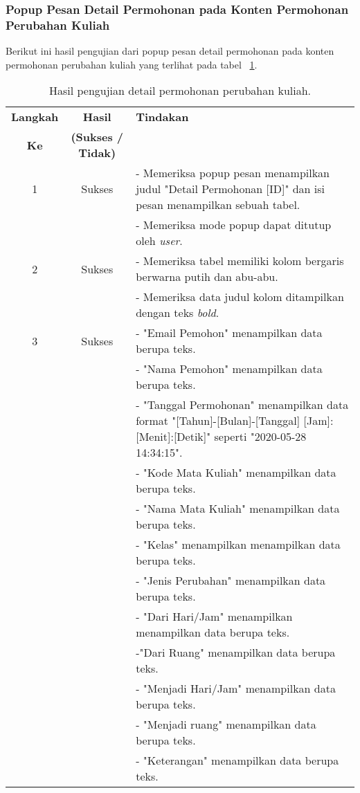 \subsubsection{Popup Pesan Detail Permohonan pada Konten Permohonan Perubahan Kuliah}
Berikut ini hasil pengujian dari popup pesan detail permohonan pada konten permohonan perubahan kuliah yang terlihat pada tabel ~\ref{hasil:DetailPermohonanPerubahanKuliah}.
\begin{table}[H]
	\centering 
	\caption{Hasil pengujian detail permohonan perubahan kuliah.}
	\label{hasil:DetailPermohonanPerubahanKuliah}
	\begin{tabular}{|c| c| p{}|}
		\toprule
		\textbf{Langkah} & \textbf{Hasil} & \textbf{Tindakan}\\
		\textbf{Ke} & \textbf{(Sukses / Tidak)} &\\
		\midrule
		1&Sukses& - Memeriksa popup pesan menampilkan judul "Detail Permohonan [ID]" dan isi pesan menampilkan sebuah tabel.\\
		&& - Memeriksa mode popup dapat ditutup oleh \textit{user}.\\
		\hline
		2&Sukses&- Memeriksa tabel memiliki kolom bergaris berwarna putih dan abu-abu.\\
		&& - Memeriksa data judul kolom ditampilkan dengan teks \textit{bold}.	\\	
		\hline
		3&Sukses&- "Email Pemohon" menampilkan data berupa teks.\\
		&&- "Nama Pemohon" menampilkan data berupa teks.\\
		&&- "Tanggal Permohonan" menampilkan data format "[Tahun]-[Bulan]-[Tanggal] [Jam]:[Menit]:[Detik]" seperti "2020-05-28 14:34:15".\\
		&&- "Kode Mata Kuliah" menampilkan data berupa teks.\\
		&&- "Nama Mata Kuliah" menampilkan data berupa teks.\\
		&&- "Kelas" menampilkan menampilkan data berupa teks.\\
		&&- "Jenis Perubahan" menampilkan data berupa teks.\\
		&&- "Dari Hari/Jam" menampilkan menampilkan data berupa teks.\\
		&& -"Dari Ruang" menampilkan data berupa teks.\\
		&&- "Menjadi Hari/Jam" menampilkan data berupa teks.\\
		&&- "Menjadi ruang" menampilkan data berupa teks.\\
		&&- "Keterangan" menampilkan data berupa teks.\\
		\bottomrule		
	\end{tabular} 
\end{table}


